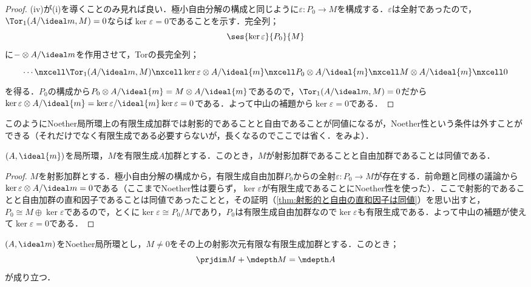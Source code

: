 \begin{proof}
	(iv)が(i)を導くことのみ見れば良い．極小自由分解の構成と同じように$\varepsilon:P_0\to M$を構成する．$\varepsilon$は全射であったので，$\Tor_1(A/\ideal m,M)=0$ならば$\ker\varepsilon=0$であることを示す．完全列；
	\[\ses{\ker\varepsilon}{P_0}{M}\]
	に$-\otimes A/\ideal m$を作用させて，Torの長完全列；
	\[\begin{tikzcd}
	\cdots\nxcell\Tor_1(A/\ideal m,M)\nxcell\ker\varepsilon\otimes A/\ideal{m}\nxcell P_0\otimes A/\ideal{m}\nxcell M\otimes A/\ideal{m}\nxcell0
	\end{tikzcd}\]
	を得る．$P_0$の構成から$P_0\otimes A/\ideal{m}=M\otimes A/\ideal{m}$であるので，$\Tor_1(A/\ideal m,M)=0$だから$\ker\varepsilon\otimes A/\ideal{m}=\ker\varepsilon/\ideal{m}\ker\varepsilon=0$である．よって中山の補題から$\ker\varepsilon=0$である．
\end{proof}

このようにNoether局所環上の有限生成加群では射影的であることと自由であることが同値になるが，Noether性という条件は外すことができる（それだけでなく有限生成である必要すらないが，長くなるのでここでは省く．\cite{matsu}をみよ）．

\begin{thm}
	$(A,\ideal{m})$を局所環，$M$を有限生成$A$加群とする．このとき，$M$が射影加群であることと自由加群であることは同値である．
\end{thm}

\begin{proof}
	$M$を射影加群とする．極小自由分解の構成から，有限生成自由加群$P_0$からの全射$\varepsilon:P_0\to M$が存在する．前命題と同様の議論から$\ker\varepsilon\otimes A/\ideal m=0$である（ここまでNoether性は要らず，$\ker\varepsilon$が有限生成であることにNoether性を使った）．ここで射影的であることと自由加群の直和因子であることは同値であったことと，その証明（\ref{thm:射影的と自由の直和因子は同値}）を思い出すと，$P_0\cong M\oplus\ker\varepsilon$であるので，とくに$\ker\varepsilon\cong P_0/M$であり，$P_0$は有限生成自由加群なので$\ker\varepsilon$も有限生成である．よって中山の補題が使えて$\ker\varepsilon=0$である．
\end{proof}

\begin{thm}\label{thm:Auslander--Buchsbaumの公式}
	$(A,\ideal m)$をNoether局所環とし，$M\neq 0$をその上の射影次元有限な有限生成加群とする．このとき；
	\[\prjdim M+\mdepth M=\mdepth A\]
	が成り立つ．
\end{thm}

